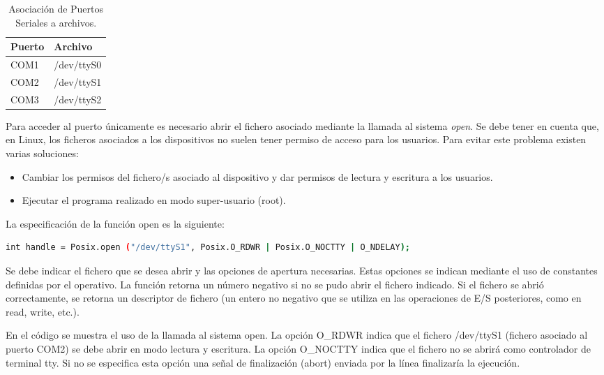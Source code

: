 \documentclass[12pt,twoside]{book}
\begin{document}
\begin{table}[htbp]
\begin{center}
\begin{tabular}{|l|l|}
\hline
Puerto & Archivo \\
\hline \hline
COM1 & /dev/ttyS0 \\ \hline
COM2 & /dev/ttyS1 \\ \hline
COM3 & /dev/ttyS2 \\ \hline
\end{tabular}
\caption{Asociación de Puertos Seriales a archivos.}
\label{T001}
\end{center}
\end{table}

Para acceder al puerto únicamente es necesario abrir el fichero asociado
mediante la llamada al sistema \emph{open}. Se debe tener en cuenta que, en Linux, los
ficheros asociados a los dispositivos no suelen tener permiso de acceso para los
usuarios. Para evitar este problema existen varias soluciones:

\begin{itemize}
\item Cambiar los permisos del fichero/s asociado al dispositivo y dar permisos
de lectura y escritura a los usuarios.
\item Ejecutar el programa realizado en modo super-usuario (root).
\end{itemize}

La especificación de la función open es la siguiente:
\begin{lstlisting}[language=bash]	
int handle = Posix.open ("/dev/ttyS1", Posix.O_RDWR | Posix.O_NOCTTY | O_NDELAY);
\end{lstlisting}

Se debe indicar el fichero que se desea abrir y las opciones de apertura
necesarias. Estas opciones se indican mediante el uso de constantes definidas
por el operativo. La función retorna un número
negativo si no se pudo abrir el fichero indicado. Si el fichero se abrió
correctamente, se retorna un descriptor de fichero (un entero no negativo que se
utiliza en las operaciones de E/S posteriores, como en read, write, etc.).

En el código se muestra el uso de la llamada al sistema open.
La opción O\_RDWR indica que el fichero /dev/ttyS1 (fichero asociado al puerto
COM2) se debe abrir en modo lectura y escritura.
La opción O\_NOCTTY indica que el fichero no se abrirá como controlador de
terminal tty. Si no se especifica esta opción una señal de finalización (abort)
enviada por la línea finalizaría la ejecución.
\end{document}
